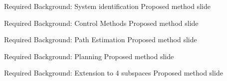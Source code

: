 \begin{frame}[fragile]{Required Background: System identification} %
  Proposed method slide
\end{frame}

\begin{frame}[fragile]{Required Background: Control Methods} %
  Proposed method slide
\end{frame}


\begin{frame}[fragile]{Required Background: Path Estimation} %
  Proposed method slide
\end{frame}

\begin{frame}[fragile]{Required Background: Planning} %
  Proposed method slide
\end{frame}


\begin{frame}[fragile]{Required Background: Extension to 4 subspaces} %
  Proposed method slide
\end{frame}
